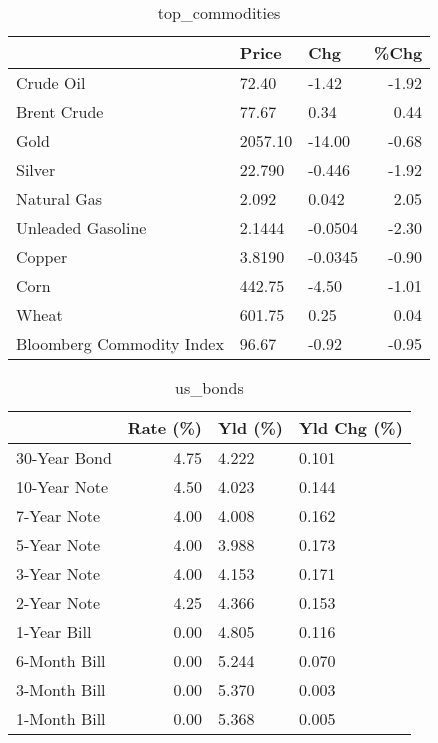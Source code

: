 \documentclass{article}%
\begin{document}
\begin{table}[htbp]%
\caption{top\_commodities}%
\centering%
\begin{adjustbox}{width=1\textwidth}%
\begin{tabular}{lllr}
\toprule
                          &   Price &     Chg &  \%Chg \\
\midrule
               Crude Oil  &   72.40 &   -1.42 & -1.92 \\
             Brent Crude  &   77.67 &    0.34 &  0.44 \\
                    Gold  & 2057.10 &  -14.00 & -0.68 \\
                  Silver  &  22.790 &  -0.446 & -1.92 \\
             Natural Gas  &   2.092 &   0.042 &  2.05 \\
       Unleaded Gasoline  &  2.1444 & -0.0504 & -2.30 \\
                  Copper  &  3.8190 & -0.0345 & -0.90 \\
                    Corn  &  442.75 &   -4.50 & -1.01 \\
                   Wheat  &  601.75 &    0.25 &  0.04 \\
Bloomberg Commodity Index &   96.67 &   -0.92 & -0.95 \\
\bottomrule
\end{tabular}
%
\end{adjustbox}%
\end{table}

%


\begin{table}[htbp]%
\caption{us\_bonds}%
\centering%
\begin{adjustbox}{width=1\textwidth}%
\begin{tabular}{lrll}
\toprule
             &  Rate (\%) & Yld (\%) & Yld Chg (\%) \\
\midrule
30-Year Bond &      4.75 &   4.222 &       0.101 \\
10-Year Note &      4.50 &   4.023 &       0.144 \\
 7-Year Note &      4.00 &   4.008 &       0.162 \\
 5-Year Note &      4.00 &   3.988 &       0.173 \\
 3-Year Note &      4.00 &   4.153 &       0.171 \\
 2-Year Note &      4.25 &   4.366 &       0.153 \\
 1-Year Bill &      0.00 &   4.805 &       0.116 \\
6-Month Bill &      0.00 &   5.244 &       0.070 \\
3-Month Bill &      0.00 &   5.370 &       0.003 \\
1-Month Bill &      0.00 &   5.368 &       0.005 \\
\bottomrule
\end{tabular}
%
\end{adjustbox}%
\end{table}
\end{document}
